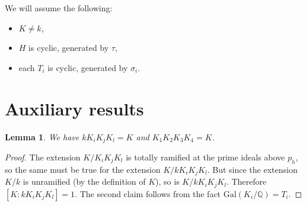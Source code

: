 \documentclass[12pt,a4paper]{article}
\newtheorem{lemma}[theorem]{Lemma}
\newcommand{\Q}{\mathbb{Q}}
\newcommand{\Gal}{\mathrm{Gal}}
\begin{document}
We will assume the following:
\begin{itemize}
\item $K\neq k$,
\item $H$ is cyclic, generated by $\tau$,
\item each $T_i$ is cyclic, generated by $\sigma_i$.
\end{itemize}

\section{Auxiliary results}

\begin{lemma}\label{comp}
We have $kK_iK_jK_l=K$ and $K_1K_2K_3K_4=K$.
\end{lemma}
\begin{proof}
The extension $K/K_iK_jK_l$ is totally ramified at the prime ideals above $p_h$, so the same must be true for the extension $K/kK_iK_jK_l$. But since the extension $K/k$ is unramified (by the definition of $K$), so is $K/kK_iK_jK_l$. Therefore $[K:kK_iK_jK_l]=1$. The second claim follows from the fact $\Gal(K_i/\Q)=T_i$.
\end{proof}
\begin{center}
\end{center}
\end{document}

